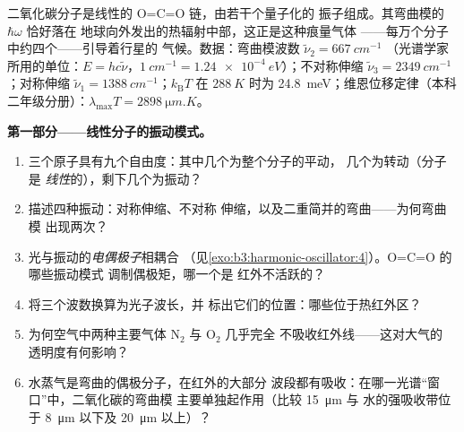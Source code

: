 \begin{problem}\label{pb:b3:harmonic-oscillator:1}
二氧化碳分子是线性的 O=C=O 链，由若干个量子化的
振子组成。其弯曲模的 $\hbar\omega$ 恰好落在
地球向外发出的热辐射中部，这正是这种痕量气体
——每万个分子中约四个——引导着行星的
气候。数据：弯曲模波数 $\tilde\nu_2 = \qty{667}{cm^{-1}}$
（光谱学家所用的单位：$E = hc\tilde\nu$，$\qty{1}{cm^{-1}} =
\qty{1.24e-4}{eV}$）；不对称伸缩 $\tilde\nu_3 =
\qty{2349}{cm^{-1}}$；对称伸缩 $\tilde\nu_1 =
\qty{1388}{cm^{-1}}$；$k_{\text{B}}T$ 在 $\qty{288}{K}$ 时为
\qty{24.8}{meV}；维恩位移定律（本科二年级分册）：$\lambda_{\max}T =
\qty{2898}{\micro m.K}$。

\medskip\noindent\textbf{第一部分——线性分子的振动模式。}
\begin{enumerate}
  \item 三个原子具有九个自由度：其中几个为整个分子的平动，
        几个为转动（分子是
        \emph{线性}的），剩下几个为振动？
  \item 描述四种振动：对称伸缩、不对称
        伸缩，以及二重简并的弯曲——为何弯曲模
        出现两次？
  \item 光与振动的\emph{电偶极子}相耦合
        （见\cref{exo:b3:harmonic-oscillator:4}）。O=C=O 的哪些振动模式
        调制偶极矩，哪一个是
        红外不活跃的？
  \item 将三个波数换算为光子波长，并
        标出它们的位置：哪些位于热红外区？
  \item 为何空气中两种主要气体 N$_2$ 与 O$_2$ 几乎完全
        不吸收红外线——这对大气的
        透明度有何影响？
  \item 水蒸气是弯曲的偶极分子，在红外的大部分
        波段都有吸收：在哪一光谱“窗口”中，二氧化碳的弯曲模
        主要单独起作用（比较 \qty{15}{\micro m} 与
        水的强吸收带位于 \qty{8}{\micro m} 以下及
        \qty{20}{\micro m} 以上）？
\end{enumerate}


\end{problem}
